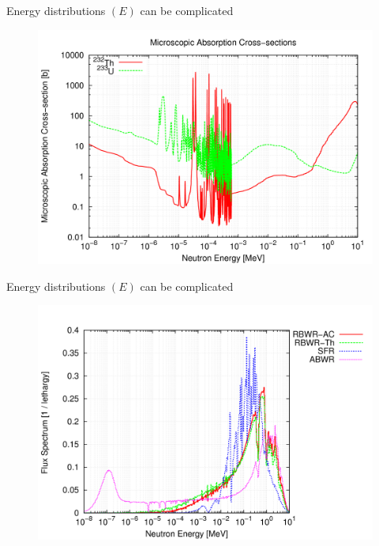 \documentclass{beamer}
\begin{document}
        \begin{frame}{Energy distributions $(E)$ can be complicated}
            \begin{figure}
                \centering
                \includegraphics[width=1.0\textwidth]{./img/energyXs.png}
                \caption*{}
            \end{figure}
        \end{frame}

        \begin{frame}{Energy distributions $(E)$ can be complicated}
            \begin{figure}
                \centering
                \includegraphics[width=1.0\textwidth]{./img/energyFlux.png}
                \caption*{}
            \end{figure}
        \end{frame}
\end{document}
